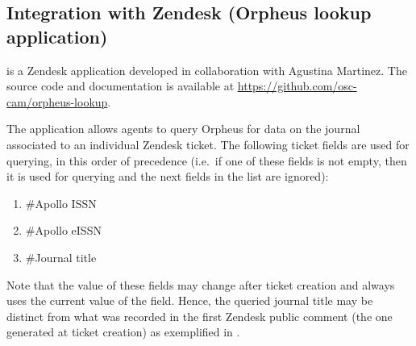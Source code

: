 \documentclass[british, 12pt]{article}
\begin{document}
\subsection{Integration with Zendesk (Orpheus lookup application)}

 is a Zendesk application developed in collaboration with Agustina Martinez. The source code and documentation is available at \url{https://github.com/osc-cam/orpheus-lookup}.

The application allows  agents to query Orpheus for data on the journal associated to an individual Zendesk ticket. The following ticket fields are used for querying, in this order of precedence (i.e.\ if one of these fields is not empty, then it is used for querying and the next fields in the list are ignored):

\begin{enumerate}
 \item \#Apollo ISSN
 \item \#Apollo eISSN
 \item \#Journal title
\end{enumerate}

\begin{warn}
  Note that the value of these fields may change after ticket creation and  always uses the current value of the field. Hence, the queried journal title may be distinct from what was recorded in the first Zendesk public comment (the one generated at ticket creation) as exemplified in \figt{\ref{fig-journal-title}}.
\end{warn}
\end{document}
